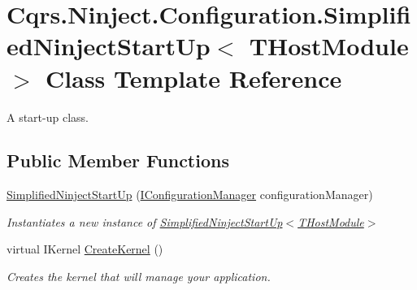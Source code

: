 \hypertarget{classCqrs_1_1Ninject_1_1Configuration_1_1SimplifiedNinjectStartUp}{}\section{Cqrs.\+Ninject.\+Configuration.\+Simplified\+Ninject\+Start\+Up$<$ T\+Host\+Module $>$ Class Template Reference}
\label{classCqrs_1_1Ninject_1_1Configuration_1_1SimplifiedNinjectStartUp}


A start-\/up class.  


\subsection*{Public Member Functions}
\begin{DoxyCompactItemize}
\item 
\hyperlink{classCqrs_1_1Ninject_1_1Configuration_1_1SimplifiedNinjectStartUp_acfbce6e504d9efb64bcfc8d612d28f95_acfbce6e504d9efb64bcfc8d612d28f95}{Simplified\+Ninject\+Start\+Up} (\hyperlink{interfaceCqrs_1_1Configuration_1_1IConfigurationManager}{I\+Configuration\+Manager} configuration\+Manager)
\begin{DoxyCompactList}\small\item\em Instantiates a new instance of \hyperlink{classCqrs_1_1Ninject_1_1Configuration_1_1SimplifiedNinjectStartUp_acfbce6e504d9efb64bcfc8d612d28f95_acfbce6e504d9efb64bcfc8d612d28f95}{Simplified\+Ninject\+Start\+Up$<$\+T\+Host\+Module$>$} \end{DoxyCompactList}\item 
virtual I\+Kernel \hyperlink{classCqrs_1_1Ninject_1_1Configuration_1_1SimplifiedNinjectStartUp_aac5ea630535b31520d4c1536bc8125ce_aac5ea630535b31520d4c1536bc8125ce}{Create\+Kernel} ()
\begin{DoxyCompactList}\small\item\em Creates the kernel that will manage your application. \end{DoxyCompactList}\end{DoxyCompactItemize}

